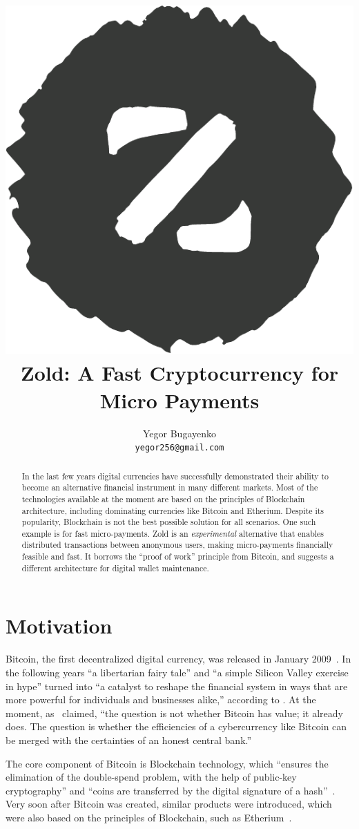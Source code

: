 \documentclass[11pt,oneside]{article}
\title{\includegraphics[scale=0.3]{../images/logo.pdf}\\Zold: A Fast Cryptocurrency for Micro Payments}
\author{Yegor Bugayenko\\\texttt{yegor256@gmail.com}\\[1em]\href{https://github.com/zold-io/papers/releases/tag/\zoldversion}{\texttt{\zoldversion}}}
\begin{document}
\raggedbottom

\maketitle
\begin{abstract}
In the last few years digital currencies have successfully demonstrated
their ability to become an alternative financial instrument in many
different markets. Most of the technologies available at the moment are
based on the principles of Blockchain architecture, including
dominating currencies like Bitcoin and Etherium. Despite its
popularity, Blockchain is not the best possible solution for all scenarios.
One such example is for fast micro-payments.
Zold is an \emph{experimental} alternative that enables distributed transactions between
anonymous users, making micro-payments financially feasible and fast.
It borrows the ``proof of work'' principle from Bitcoin,
and suggests a different architecture for digital wallet maintenance.
\end{abstract}

\section{Motivation}

Bitcoin, the first decentralized digital currency, was released in January 2009~\parencite{nakamoto2008}.
In the following years ``a libertarian fairy tale'' and ``a simple Silicon Valley exercise in hype''
turned into ``a catalyst to reshape the financial system in ways that are more
powerful for individuals and businesses alike,'' according to \textcite{andreessen2014}.
At the moment, as~\textcite{van2014} claimed, ``the question is not whether Bitcoin has value; it already does.
The question is whether the efficiencies of a cybercurrency
like Bitcoin can be merged with the certainties of an honest central bank.''

The core component of Bitcoin is Blockchain technology, which
``ensures the elimination of the double-spend problem, with the help
of public-key cryptography'' and ``coins are transferred by the
digital signature of a hash''~\parencite{pilkington2016}.
Very soon after Bitcoin was created, similar products were introduced,
which were also based on the principles of Blockchain, such as
Etherium~\parencite{buterin2013}.
\end{document}
